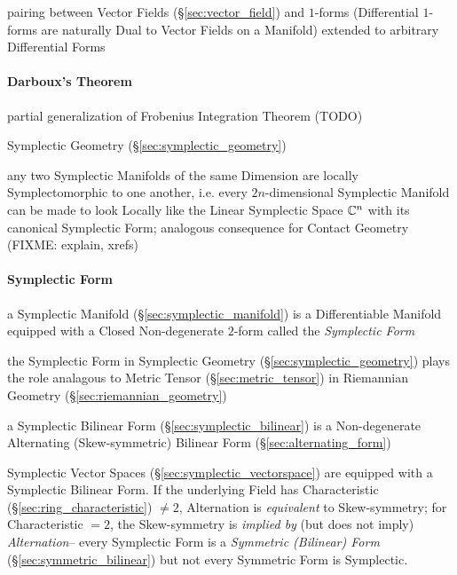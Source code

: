 {pairing between Vector Fields (\S\ref{sec:vector_field}) and $1$-forms
(Differential $1$-forms are naturally Dual to Vector Fields on a Manifold)
extended to arbitrary Differential Forms



\paragraph{Darboux's Theorem}\label{sec:darbouxs_theorem}\hfill

partial generalization of Frobenius Integration Theorem (TODO)

Symplectic Geometry (\S\ref{sec:symplectic_geometry})

any two Symplectic Manifolds of the same Dimension are locally Symplectomorphic
to one another, i.e. every $2n$-dimensional Symplectic Manifold can be made to
look Locally like the Linear Symplectic Space $\mathbb{C}^n$ with its canonical
Symplectic Form; analogous consequence for Contact Geometry (FIXME: explain,
xrefs)



\paragraph{Symplectic Form}\label{sec:symplectic_form}\hfill


a Symplectic Manifold (\S\ref{sec:symplectic_manifold}) is a Differentiable
Manifold equipped with a Closed Non-degenerate $2$-form called the
\emph{Symplectic Form}

the Symplectic Form in Symplectic Geometry (\S\ref{sec:symplectic_geometry})
plays the role analagous to Metric Tensor (\S\ref{sec:metric_tensor}) in
Riemannian Geometry (\S\ref{sec:riemannian_geometry})

a Symplectic Bilinear Form (\S\ref{sec:symplectic_bilinear}) is a
Non-degenerate Alternating (Skew-symmetric) Bilinear Form
(\S\ref{sec:alternating_form})

Symplectic Vector Spaces (\S\ref{sec:symplectic_vectorspace}) are equipped with
a Symplectic Bilinear Form. If the underlying Field has Characteristic
(\S\ref{sec:ring_characteristic}) $\neq 2$, Alternation is \emph{equivalent} to
Skew-symmetry; for Characteristic $=2$, the Skew-symmetry is \emph{implied by}
(but does not imply) \emph{Alternation}-- every Symplectic Form is a
\emph{Symmetric (Bilinear) Form} (\S\ref{sec:symmetric_bilinear}) but not
every Symmetric Form is Symplectic.

}
